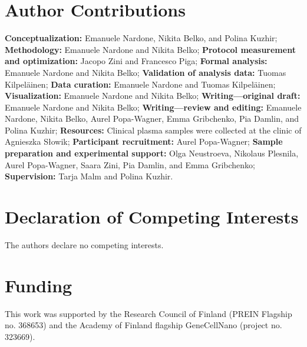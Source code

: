 \documentclass[preprint,12pt]{elsarticle}
\begin{document}
\section*{Author Contributions}

\noindent
\textbf{Conceptualization:} Emanuele Nardone, Nikita Belko, and Polina Kuzhir;
\textbf{Methodology:} Emanuele Nardone and Nikita Belko;
\textbf{Protocol measurement and optimization:} Jacopo Zini and Francesco Piga;
\textbf{Formal analysis:} Emanuele Nardone and Nikita Belko;
\textbf{Validation of analysis data:} Tuomas Kilpeläinen;
\textbf{Data curation:} Emanuele Nardone and Tuomas Kilpeläinen;
\textbf{Visualization:} Emanuele Nardone and Nikita Belko;
\textbf{Writing---original draft:} Emanuele Nardone and Nikita Belko;
\textbf{Writing---review and editing:} Emanuele Nardone, Nikita Belko, Aurel Popa-Wagner, Emma Gribchenko, Pia Damlin, and Polina Kuzhir;
\textbf{Resources:} Clinical plasma samples were collected at the clinic of Agnieszka Słowik;
\textbf{Participant recruitment:} Aurel Popa-Wagner;
\textbf{Sample preparation and experimental support:} Olga Neustroeva, Nikolaus Plesnila, Aurel Popa-Wagner, Saara Zini, Pia Damlin, and Emma Gribchenko;
\textbf{Supervision:} Tarja Malm and Polina Kuzhir.


\section*{Declaration of Competing Interests}

The authors declare no competing interests.

\section*{Funding}

This work was supported by the Research Council of Finland (PREIN Flagship no. 368653) and the Academy of Finland flagship GeneCellNano (project no. 323669).


\FloatBarrier
 
\end{document}
